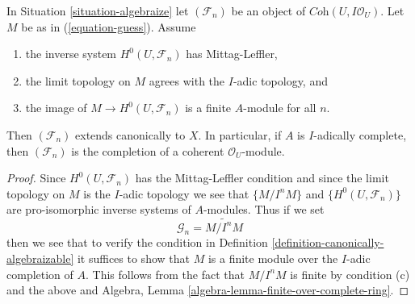 \begin{lemma}
\label{lemma-when-done}
In Situation \ref{situation-algebraize} let $(\mathcal{F}_n)$ be an object
of $\textit{Coh}(U, I\mathcal{O}_U)$. Let $M$ be as in (\ref{equation-guess}).
Assume
\begin{enumerate}
\item[(a)] the inverse system $H^0(U, \mathcal{F}_n)$ has Mittag-Leffler,
\item[(b)] the limit topology on $M$ agrees with the $I$-adic topology, and
\item[(c)] the image of $M \to H^0(U, \mathcal{F}_n)$ is a finite $A$-module
for all $n$.
\end{enumerate}
Then $(\mathcal{F}_n)$ extends canonically to $X$.
In particular, if $A$ is $I$-adically complete, then
$(\mathcal{F}_n)$ is the completion of a coherent $\mathcal{O}_U$-module.
\end{lemma}

\begin{proof}
Since $H^0(U, \mathcal{F}_n)$ has the Mittag-Leffler condition
and since the limit topology on $M$ is the $I$-adic topology
we see that $\{M/I^nM\}$ and $\{H^0(U, \mathcal{F}_n)\}$
are pro-isomorphic inverse systems of $A$-modules.
Thus if we set
$$
\mathcal{G}_n = \widetilde{M/I^n M}
$$
then we see that to verify the condition in
Definition \ref{definition-canonically-algebraizable}
it suffices to show that $M$ is a finite module over the
$I$-adic completion of $A$. This follows from
the fact that $M/I^n M$ is finite by condition (c)
and the above and
Algebra, Lemma \ref{algebra-lemma-finite-over-complete-ring}.
\end{proof}
